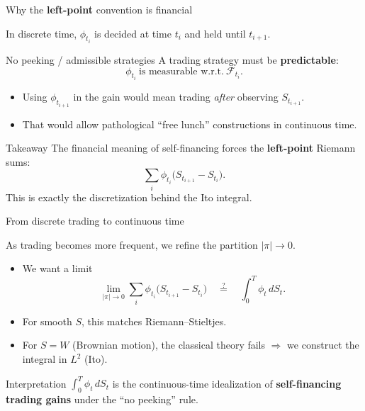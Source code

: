 \documentclass[10pt,aspectratio=169]{beamer}
\newcommand{\cF}{\mathcal{F}}
\begin{document}
\begin{frame}{Why the \textbf{left-point} convention is financial}

In discrete time, $\phi_{t_i}$ is decided at time $t_i$ and held until $t_{i+1}$.\pause

\begin{block}{No peeking / admissible strategies}
A trading strategy must be \textbf{predictable}:
\[
\phi_{t_i}\ \text{is measurable w.r.t.}\ \cF_{t_i}.
\]
\end{block}
\pause

\begin{itemize}
  \item Using $\phi_{t_{i+1}}$ in the gain would mean trading \emph{after} observing $S_{t_{i+1}}$.\pause
  \item That would allow pathological “free lunch” constructions in continuous time.\pause
\end{itemize}

\medskip
\begin{alertblock}{Takeaway}
The financial meaning of self-financing forces the \textbf{left-point} Riemann sums:
\[
\sum_{i}\phi_{t_i}\big(S_{t_{i+1}}-S_{t_i}\big).
\]
This is exactly the discretization behind the Ito integral.
\end{alertblock}

\end{frame}

\begin{frame}{From discrete trading to continuous time}

As trading becomes more frequent, we refine the partition $|\pi|\to 0$.\pause

\begin{itemize}
  \item We want a limit
  \[
  \lim_{|\pi|\to 0}\sum_{i}\phi_{t_i}\big(S_{t_{i+1}}-S_{t_i}\big)
  \quad \stackrel{?}{=}\quad \int_0^T \phi_t\, dS_t.
  \]
  \pause
  \item For smooth $S$, this matches Riemann--Stieltjes.\pause
  \item For $S=W$ (Brownian motion), the classical theory fails
  $\Rightarrow$ we construct the integral in $L^2$ (Ito).
\end{itemize}

\medskip
\begin{block}{Interpretation}
$\displaystyle \int_0^T \phi_t\, dS_t$ is the continuous-time idealization of
\textbf{self-financing trading gains} under the “no peeking” rule.
\end{block}

\end{frame}
\end{document}
